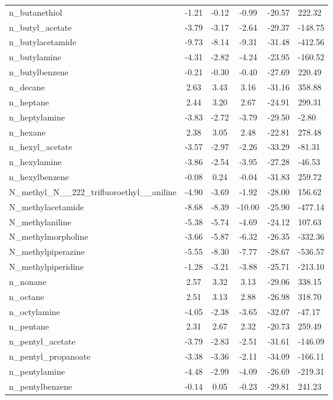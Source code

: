 \documentclass{amsart}
\begin{document}
\begin{longtable}{L|C|C|C|X|X}
n\_butanethiol & -1.21 & -0.12 & -0.99 & -20.57 & 222.32 \\ 
n\_butyl\_acetate & -3.79 & -3.17 & -2.64 & -29.37 & -148.75 \\ 
n\_butylacetamide & -9.73 & -8.14 & -9.31 & -31.48 & -412.56 \\ 
n\_butylamine & -4.31 & -2.82 & -4.24 & -23.95 & -160.52 \\ 
n\_butylbenzene & -0.21 & -0.30 & -0.40 & -27.69 & 220.49 \\ 
n\_decane & 2.63 & 3.43 & 3.16 & -31.16 & 358.88 \\ 
n\_heptane & 2.44 & 3.20 & 2.67 & -24.91 & 299.31 \\ 
n\_heptylamine & -3.83 & -2.72 & -3.79 & -29.50 & -2.80 \\ 
n\_hexane & 2.38 & 3.05 & 2.48 & -22.81 & 278.48 \\ 
n\_hexyl\_acetate & -3.57 & -2.97 & -2.26 & -33.29 & -81.31 \\ 
n\_hexylamine & -3.86 & -2.54 & -3.95 & -27.28 & -46.53 \\ 
n\_hexylbenzene & -0.08 & 0.24 & -0.04 & -31.83 & 259.72 \\ 
N\_methyl\_N\_\_222\_trifluoroethyl\_\_aniline & -4.90 & -3.69 & -1.92 & -28.00 & 156.62 \\ 
N\_methylacetamide & -8.68 & -8.39 & -10.00 & -25.90 & -477.14 \\ 
N\_methylaniline & -5.38 & -5.74 & -4.69 & -24.12 & 107.63 \\ 
N\_methylmorpholine & -3.66 & -5.87 & -6.32 & -26.35 & -332.36 \\ 
N\_methylpiperazine & -5.55 & -8.30 & -7.77 & -28.67 & -536.57 \\ 
N\_methylpiperidine & -1.28 & -3.21 & -3.88 & -25.71 & -213.10 \\ 
n\_nonane & 2.57 & 3.32 & 3.13 & -29.06 & 338.15 \\ 
n\_octane & 2.51 & 3.13 & 2.88 & -26.98 & 318.70 \\ 
n\_octylamine & -4.05 & -2.38 & -3.65 & -32.07 & -47.17 \\ 
n\_pentane & 2.31 & 2.67 & 2.32 & -20.73 & 259.49 \\ 
n\_pentyl\_acetate & -3.79 & -2.83 & -2.51 & -31.61 & -146.09 \\ 
n\_pentyl\_propanoate & -3.38 & -3.36 & -2.11 & -34.09 & -166.11 \\ 
n\_pentylamine & -4.48 & -2.99 & -4.09 & -26.69 & -219.31 \\ 
n\_pentylbenzene & -0.14 & 0.05 & -0.23 & -29.81 & 241.23 \\ 

\end{longtable}
\end{document}
